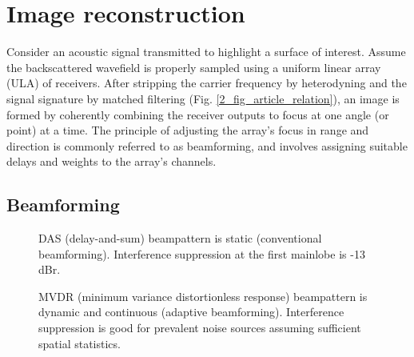{\section{Image reconstruction}\label{methods}

Consider an acoustic signal transmitted to highlight a surface of interest. Assume the backscattered wavefield is properly sampled using a uniform linear array (ULA) of receivers. After stripping the carrier frequency by heterodyning and the signal signature by matched filtering (Fig. \ref{2_fig_article_relation}), an image is formed by coherently combining the receiver outputs to focus at one angle (or point) at a time. The principle of adjusting the array's focus in range and direction is commonly referred to as beamforming, and involves assigning suitable delays and weights to the array's channels.



\subsection{Beamforming}

\begin{figure}[tp]
\caption{DAS (delay-and-sum) beampattern is static (conventional beamforming). Interference suppression at the first mainlobe is -13\,dBr.}%
\label{2_fig_scenario_das}
\end{figure}

\begin{figure}[tp]
\caption{MVDR (minimum variance distortionless response) beampattern is dynamic and continuous (adaptive beamforming). Interference suppression is good for prevalent noise sources assuming sufficient spatial statistics.}%
\label{2_fig_scenario_mvdr}
\end{figure}

}
